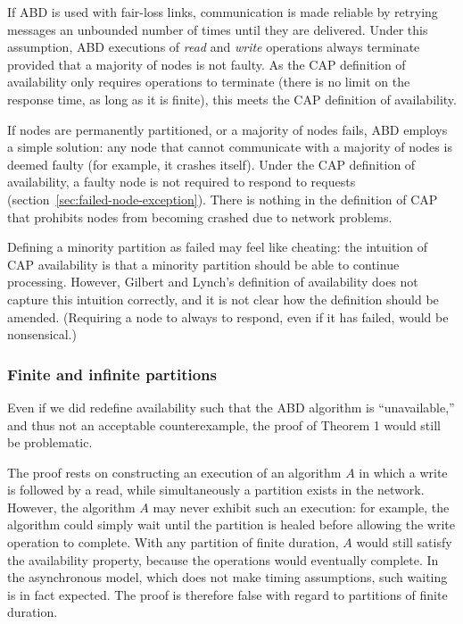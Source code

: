 \documentclass[a4paper,twocolumn,10pt]{article}
\begin{document}
If ABD is used with fair-loss links, communication is made reliable by retrying messages an
unbounded number of times until they are delivered. Under this assumption, ABD executions of
\emph{read} and \emph{write} operations always terminate provided that a majority of nodes is not
faulty. As the CAP definition of availability only requires operations to terminate (there is no
limit on the response time, as long as it is finite), this meets the CAP definition of availability.

If nodes are permanently partitioned, or a majority of nodes fails, ABD employs a simple solution:
any node that cannot communicate with a majority of nodes is deemed faulty (for example, it crashes
itself). Under the CAP definition of availability, a faulty node is not required to respond to
requests (section~\ref{sec:failed-node-exception}). There is nothing in the definition of CAP that
prohibits nodes from becoming crashed due to network problems.

Defining a minority partition as failed may feel like cheating: the intuition of CAP availability is
that a minority partition should be able to continue processing. However, Gilbert and Lynch's
definition of availability does not capture this intuition correctly, and it is not clear how the
definition should be amended. (Requiring a node to always to respond, even if it has failed, would
be nonsensical.)

\subsubsection{Finite and infinite partitions}

Even if we did redefine availability such that the ABD algorithm is ``unavailable,'' and thus not an
acceptable counterexample, the proof of Theorem 1 would still be problematic.

The proof rests on constructing an execution of an algorithm $A$ in which a write is followed by a
read, while simultaneously a partition exists in the network. However, the algorithm $A$ may never
exhibit such an execution: for example, the algorithm could simply wait until the partition is
healed before allowing the write operation to complete. With any partition of finite duration, $A$
would still satisfy the availability property, because the operations would eventually complete. In
the asynchronous model, which does not make timing assumptions, such waiting is in fact expected.
The proof is therefore false with regard to partitions of finite duration.
\end{document}
